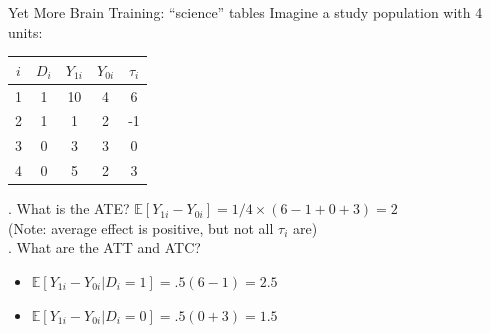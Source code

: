 \documentclass[xcolor=dvipsnames]{beamer}
\newcommand\E{\mathbb{E}}
\begin{document}
\begin{frame}{Yet More Brain Training: ``science'' tables}
Imagine a study population with 4 units:

\begin{table}[ht]
    \centering
    \begin{tabular}{c  c c c c }
      $i$ & $D_i$ & $Y_{1i}$ & $Y_{0i}$ & $\tau_i$ \\ \hline
      1  & 1 & 10  & 4 & 6 \\
      2  & 1 & 1  & 2 & -1 \\
      3 & 0 & 3 & 3 & 0 \\
      4 & 0 & 5 & 2 & 3 \\
    \end{tabular}
    \end{table}

. What is the ATE?
 \small $\E[Y_{1i} - Y_{0i}] = 1/4 \times (6-1+0+3)=2$ \\
\medskip
\footnotesize(Note: average effect is positive, but not all $\tau_i$ are)\\
\small
\medskip
{}. What are the ATT and ATC? \\
\begin{itemize}
\item<5->[] $\E[Y_{1i}-Y_{0i}|D_i=1]=.5(6-1)=2.5$\\
\item<6->[] $\E[Y_{1i}-Y_{0i}|D_i=0] =.5(0+3)=1.5$
\end{itemize}
\end{frame}
\end{document}
